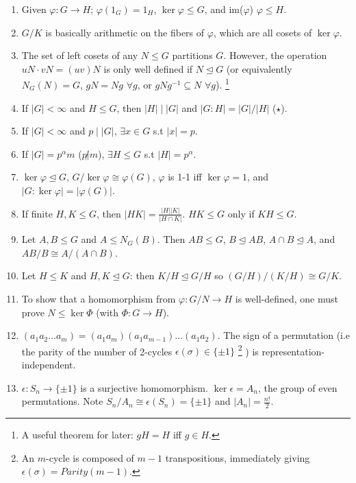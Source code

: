 \documentclass{article}
\begin{document}
\begin{enumerate}[1.]
    \item Given $\varphi : G \rightarrow H$; $\varphi(1_G) = 1_H$, 
        $\ker \varphi \leq G$, and im($\varphi$) $\varphi \leq H$.
    \item $G/K$ is basically arithmetic on the fibers of $\varphi$, which
        are all cosets of $\ker \varphi$.
    \item The set of left cosets of any $N \leq G$ partitions $G$. However,
        the operation $uN \cdot vN = (uv)N$ is only well defined if $N
        \trianglelefteq G$ (or equivalently $N_G(N) = G$, $gN = Ng$ $\forall
        g$, or $gNg^{-1} \subseteq N$ $\forall g$).
        \footnote{A useful theorem for later: $gH = H$ iff $g \in H$.}
    \item If $|G| < \infty$ and $H \leq G$, then $|H| \mid |G|$ and 
        $|G : H| = |G|/|H|$ ($\star$).
    \item If $|G| < \infty$ and $p \mid |G|$, $\exists x \in G$ s.t $|x| =
        p$.
    \item If $|G| = p^{\alpha}m$ ($p \not| m$), $\exists H \leq G$ s.t $|H|
        = p^{\alpha}$.
    \item $\ker \varphi \trianglelefteq G$, $G/\ker \varphi \cong
        \varphi(G)$, $\varphi$ is 1-1 iff $\ker \varphi = 1$, and 
        $|G : \ker \varphi| = |\varphi(G)|$.
    \item If finite $H, K \leq G$, then $|HK| = \frac{|H||K|}{|H \cap K|}$. 
        $HK \leq G$ only if $KH \leq G$.
    \item Let $A,B \leq G$ and $A \leq N_G(B)$. Then $AB \leq G$, $B
        \trianglelefteq AB$, $A \cap B \trianglelefteq A$, and $AB/B \cong
        A/(A \cap B)$.
    \item Let $H \leq K$ and $H,K \trianglelefteq G$: then $K/H
        \trianglelefteq G/H$ so $(G/H)/(K/H) \cong G/K$.
    \item To show that a homomorphism from $\varphi : G/N \rightarrow H$ is
        well-defined, one must prove $N \leq \ker \Phi$ (with $\Phi : G
        \rightarrow H$).
    \item $(a_1 a_2 ... a_m) = (a_1 a_m)(a_1 a_{m-1})...(a_1 a_2)$. 
        The sign of a permutation (i.e the parity of the number of
        2-cycles $\epsilon(\sigma) \in \{\pm 1\}$
        \footnote{An $m$-cycle is composed of $m-1$ transpositions, 
            immediately giving $\epsilon(\sigma) = Parity(m-1)$.}
        ) is representation-independent.
    \item $\epsilon : S_n \rightarrow \{\pm 1\}$ is a surjective
        homomorphism. $\ker \epsilon = A_n$, the group of even permutations.
        Note $S_n/A_n \cong \epsilon(S_n) = \{\pm 1\}$ and $|A_n| =
        \frac{n!}{2}$.
\end{enumerate}
\end{document}

